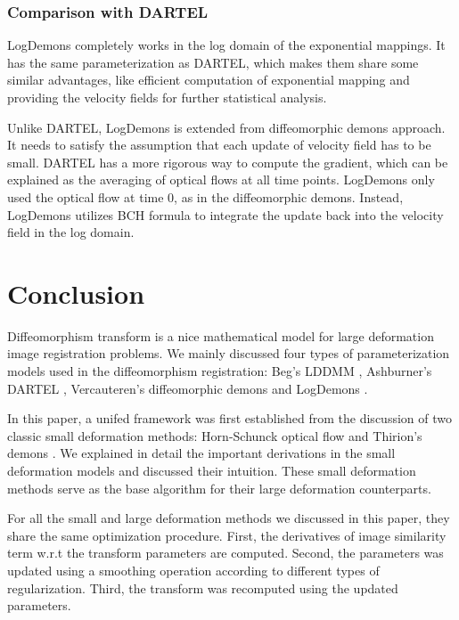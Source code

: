 \documentclass[letterpaper,12pt]{article}
\begin{document}
\subsubsection{Comparison with DARTEL}

LogDemons completely works in the log domain of the exponential mappings. It has the same parameterization as DARTEL, which makes them share some similar advantages, like efficient computation of exponential mapping and providing the velocity fields for further statistical analysis.

Unlike DARTEL, LogDemons is extended from diffeomorphic demons approach. It needs to satisfy the assumption that each update of velocity field has to be small. DARTEL has a more rigorous way to compute the gradient, which can be explained as the averaging of optical flows at all time points. LogDemons only used the optical flow at time $0$, as in the diffeomorphic demons. Instead, LogDemons utilizes BCH formula to integrate the update back into the velocity field in the log domain. 

 

\section{Conclusion}

Diffeomorphism transform is a nice mathematical model for large deformation image registration problems.  We mainly discussed four types of parameterization models used in the diffeomorphism registration: Beg's LDDMM \cite{Beg2005Computing}, Ashburner's DARTEL \cite{Ashburner2007}, Vercauteren's diffeomorphic demons \cite{Vercauteren2009} and LogDemons \cite{Vercauteren2008Symmetric}. 

In this paper, a unifed framework was first established from the discussion of two classic small deformation methods: Horn-Schunck optical flow \cite{Horn1981} and Thirion's demons \cite{Thirion98}. We explained in detail the important derivations in the small deformation models and discussed their intuition. These small deformation methods serve as the base algorithm for their large deformation counterparts.

For all the small and large deformation methods we discussed in this paper, they share the same optimization procedure. First, the derivatives of image similarity term w.r.t the transform parameters are computed. Second, the parameters was updated using a smoothing operation according to different types of regularization. Third, the transform was recomputed using the updated parameters. 
\end{document}
